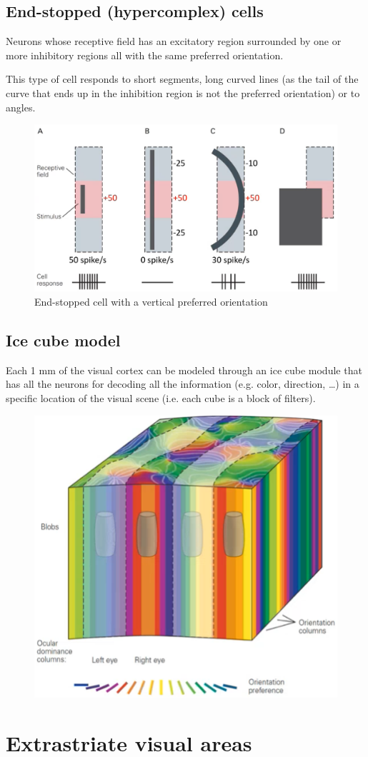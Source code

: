 \subsection{End-stopped (hypercomplex) cells}

Neurons whose receptive field has an excitatory region surrounded by one or more inhibitory regions all with the same preferred orientation.

This type of cell responds to short segments, long curved lines (as the tail of the curve that ends up in the inhibition region is not the preferred orientation)
or to angles.

\begin{figure}[H]
    \centering
    \includegraphics[width=0.5\linewidth]{./img/end_stopped_cell.png}
    \caption{End-stopped cell with a vertical preferred orientation}
\end{figure}


\subsection{Ice cube model}

Each 1 mm of the visual cortex can be modeled through an ice cube module 
that has all the neurons for decoding all the information (e.g. color, direction, \dots) in a specific location of the visual scene (i.e. each cube is a block of filters).

\begin{figure}[H]
    \centering
    \includegraphics[width=0.3\linewidth]{./img/ice_cube.png}
\end{figure}



\section{Extrastriate visual areas}

